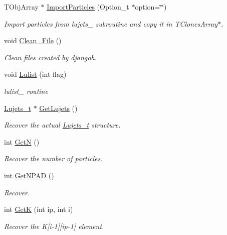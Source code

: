\begin{DoxyCompactItemize}
T\+Obj\+Array $\ast$ \hyperlink{class_t_djangoh_ac63f2c463b6a2fff98f256952aaf945f}{Import\+Particles} (Option\+\_\+t $\ast$option=\char`\"{}\char`\"{})
\begin{DoxyCompactList}\small\item\em Import particles from lujets\+\_\+ subroutine and copy it in T\+Clones\+Array$\ast$. \end{DoxyCompactList}\item 
void \hyperlink{class_t_djangoh_adf5acc5294013735f2475d4ce8ccf012}{Clean\+\_\+\+File} ()
\begin{DoxyCompactList}\small\item\em Clean files created by djangoh. \end{DoxyCompactList}\item 
void \hyperlink{class_t_djangoh_a35e52b50d96fa03b74dc23cc32a8ca6f}{Lulist} (int flag)
\begin{DoxyCompactList}\small\item\em lulist\+\_\+ routine \end{DoxyCompactList}\item 
\hyperlink{struct_lujets__t}{Lujets\+\_\+t} $\ast$ \hyperlink{class_t_djangoh_a2572e682379a304f84f21840d488fa0c}{Get\+Lujets} ()
\begin{DoxyCompactList}\small\item\em Recover the actual \hyperlink{struct_lujets__t}{Lujets\+\_\+t} structure. \end{DoxyCompactList}\item 
int \hyperlink{class_t_djangoh_a501e50bbb1ad6a75014fd7c555313b74}{Get\+N} ()
\begin{DoxyCompactList}\small\item\em Recover the number of particles. \end{DoxyCompactList}\item 
int \hyperlink{class_t_djangoh_afb58be11a10e8a6a4b442ea0fe4e16f5}{Get\+N\+P\+A\+D} ()
\begin{DoxyCompactList}\small\item\em Recover. \end{DoxyCompactList}\item 
int \hyperlink{class_t_djangoh_aaf2c94dbb8382bbd3b7ed1530a8ac878}{Get\+K} (int ip, int i)
\begin{DoxyCompactList}\small\item\em Recover the K\mbox{[}i-\/1\mbox{]}\mbox{[}ip-\/1\mbox{]} element. \end{DoxyCompactList}\item 

\end{DoxyCompactItemize}

